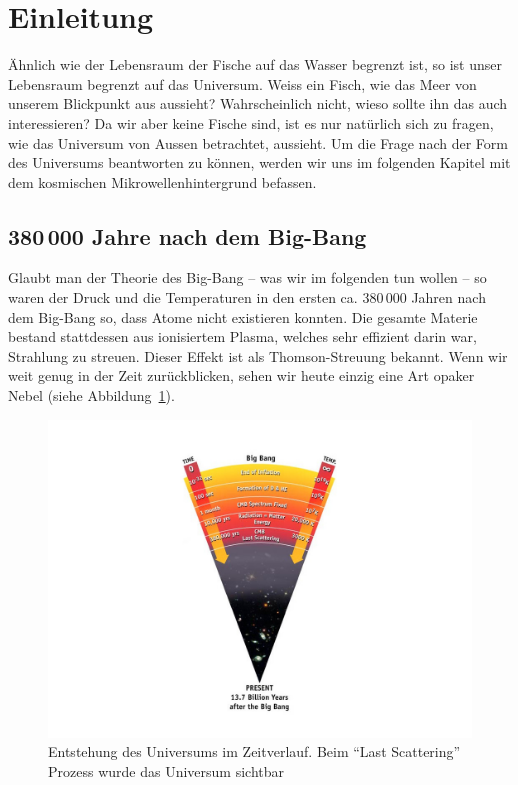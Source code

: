 \section{Einleitung}
Ähnlich wie der Lebensraum der Fische auf das Wasser begrenzt ist, so ist unser 
Lebensraum begrenzt auf das Universum.
Weiss ein Fisch, wie das Meer von unserem Blickpunkt aus aussieht?
Wahrscheinlich nicht, wieso sollte ihn das auch interessieren?
Da wir aber keine Fische sind, ist es nur natürlich sich zu fragen, wie das 
Universum von Aussen betrachtet, aussieht.
Um die Frage nach der Form des Universums beantworten zu können, werden wir uns 
im folgenden Kapitel mit dem kosmischen Mikrowellenhintergrund befassen.

\subsection{380\,000 Jahre nach dem Big-Bang}
Glaubt man der Theorie des Big-Bang -- was wir im folgenden tun wollen -- so 
waren 
der Druck und die Temperaturen in den ersten ca. 380\,000 Jahren nach dem 
Big-Bang so, dass Atome nicht existieren konnten.
Die gesamte Materie bestand stattdessen aus ionisiertem Plasma, welches sehr 
effizient darin war, Strahlung zu streuen. Dieser Effekt ist als 
Thomson-Streuung bekannt.
Wenn wir weit genug in der Zeit zurückblicken, sehen wir heute einzig eine Art 
opaker Nebel (siehe Abbildung~\ref{fig:radiation_scattering}).
\begin{figure}
	\centering
	\includegraphics[width=\linewidth]{cmb/images/radiation_scattering.jpg}
	\caption{Entstehung des Universums im Zeitverlauf. Beim ``Last Scattering'' 
	Prozess wurde das Universum sichtbar}
	\label{fig:radiation_scattering}
\end{figure}

